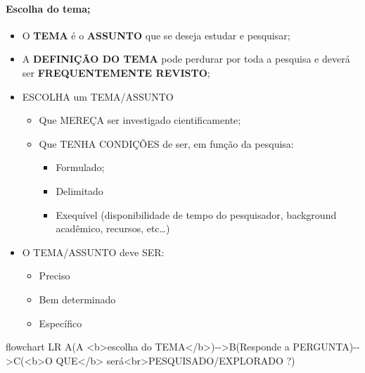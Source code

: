 \documentclass[
]{book}
\newenvironment{Shaded}{\begin{snugshade}}{\end{snugshade}}
\newcommand{\NormalTok}[1]{#1}
\providecommand{\tightlist}{%
  \setlength{\itemsep}{0pt}\setlength{\parskip}{0pt}}
\begin{document}
\hypertarget{escolha-do-tema}{%
\paragraph{Escolha do tema;}\label{escolha-do-tema}}

\begin{itemize}
\tightlist
\item
  O \textbf{TEMA} é o \textbf{ASSUNTO} que se deseja estudar e
  pesquisar;
\item
  A \textbf{DEFINIÇÃO DO TEMA} pode perdurar por toda a pesquisa e
  deverá ser \textbf{FREQUENTEMENTE REVISTO};
\item
  ESCOLHA um TEMA/ASSUNTO

  \begin{itemize}
  \tightlist
  \item
    Que MEREÇA ser investigado cientificamente;
  \item
    Que TENHA CONDIÇÕES de ser, em função da pesquisa:

    \begin{itemize}
    \tightlist
    \item
      Formulado;
    \item
      Delimitado
    \item
      Exequível (disponibilidade de tempo do pesquisador, background
      acadêmico, recursos, etc\ldots)
    \end{itemize}
  \end{itemize}
\item
  O TEMA/ASSUNTO deve SER:

  \begin{itemize}
  \tightlist
  \item
    Preciso
  \item
    Bem determinado
  \item
    Específico
  \end{itemize}
\end{itemize}

\begin{Shaded}
\begin{Highlighting}[]
\NormalTok{flowchart LR}
\NormalTok{A(A \textless{}b\textgreater{}escolha do TEMA\textless{}/b\textgreater{}){-}{-}\textgreater{}B(Responde a PERGUNTA){-}{-}\textgreater{}C(\textless{}b\textgreater{}O QUE\textless{}/b\textgreater{} será\textless{}br\textgreater{}PESQUISADO/EXPLORADO ?)}
\end{Highlighting}
\end{Shaded}
\end{document}
